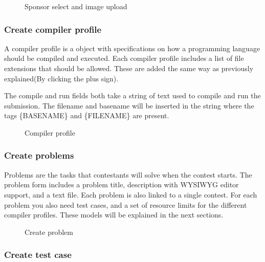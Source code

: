 \begin{figure}
\centering
 	\caption{Sponsor select and image upload}
 	\label{fig:sponsorUpload}
\end{figure}


\subsubsection{Create compiler profile}

A compiler profile is a object with specifications on how a programming
language should be compiled and executed. Each compiler profile
includes a list of file extensions that should be allowed. These are
added the same way as previously explained(By clicking the plus sign).

The compile and run fields both take a string of text used to compile
and run the submission. The filename and basename will be inserted in
the string where the tags \{BASENAME\} and \{FILENAME\} are present.

\begin{figure}
\centering
	\caption{Compiler profile}
	\label{fig:compilerProfile}
\end{figure}



\bigskip

\subsubsection{Create problems}

Problems are the tasks that contestants will solve when the contest
starts. The problem form includes a problem title, description with
WYSIWYG editor support, and a text file. Each problem is also linked to
a single contest. For each problem you also need test cases, and a set
of resource limits for the different compiler profiles. These models
will be explained in the next sections.


\begin{figure}
\centering
	\caption{Create problem}
	\label{fig:problem}
\end{figure}

\subsubsection{Create test case}

